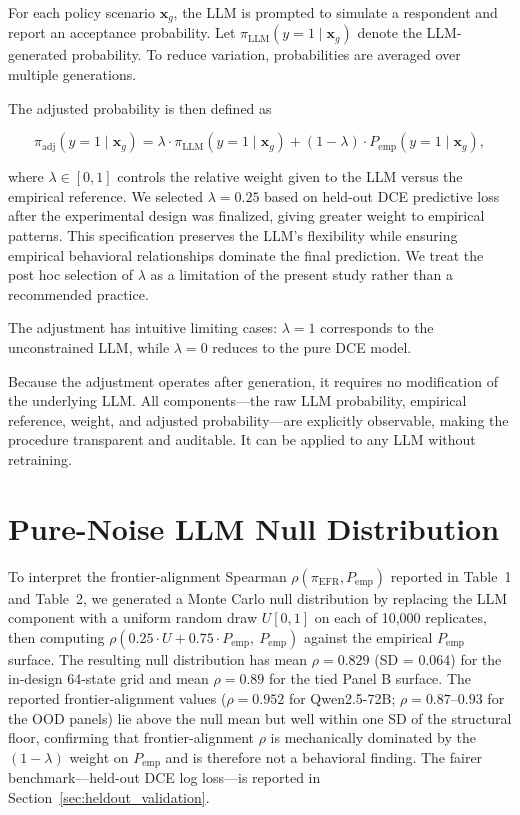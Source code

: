 \documentclass[11pt]{article}
\begin{document}
For each policy scenario $\mathbf{x}_g$, the LLM is prompted to simulate a respondent and report an acceptance probability. Let $\pi_{\mathrm{LLM}}(y=1\mid\mathbf{x}_g)$ denote the LLM-generated probability. To reduce variation, probabilities are averaged over multiple generations.

The adjusted probability is then defined as

\begin{equation}
\pi_{\mathrm{adj}}(y=1\mid\mathbf{x}_g) = \lambda \cdot \pi_{\mathrm{LLM}}(y=1\mid\mathbf{x}_g) + (1-\lambda) \cdot P_{\mathrm{emp}}(y=1\mid\mathbf{x}_g),
\label{eq:adjustment}
\end{equation}

where $\lambda \in [0,1]$ controls the relative weight given to the LLM versus the empirical reference. We selected $\lambda = 0.25$ based on held-out DCE predictive loss after the experimental design was finalized, giving greater weight to empirical patterns. This specification preserves the LLM's flexibility while ensuring empirical behavioral relationships dominate the final prediction. We treat the post hoc selection of $\lambda$ as a limitation of the present study rather than a recommended practice.

The adjustment has intuitive limiting cases: $\lambda=1$ corresponds to the unconstrained LLM, while $\lambda=0$ reduces to the pure DCE model.

Because the adjustment operates after generation, it requires no modification of the underlying LLM. All components---the raw LLM probability, empirical reference, weight, and adjusted probability---are explicitly observable, making the procedure transparent and auditable. It can be applied to any LLM without retraining.

\renewcommand{\thetable}{S\arabic{table}}
\setcounter{table}{0}

\section{Pure-Noise LLM Null Distribution}
\label{sec:null_distribution}

To interpret the frontier-alignment Spearman $\rho(\pi_{\text{EFR}}, P_{\text{emp}})$ reported in Table~1 and Table~2, we generated a Monte Carlo null distribution by replacing the LLM component with a uniform random draw $U[0, 1]$ on each of 10{,}000 replicates, then computing $\rho(0.25 \cdot U + 0.75 \cdot P_{\text{emp}},\ P_{\text{emp}})$ against the empirical $P_{\text{emp}}$ surface. The resulting null distribution has mean $\rho = 0.829$ (SD = 0.064) for the in-design 64-state grid and mean $\rho = 0.89$ for the tied Panel B surface. The reported frontier-alignment values ($\rho = 0.952$ for Qwen2.5-72B; $\rho = 0.87$--$0.93$ for the OOD panels) lie above the null mean but well within one SD of the structural floor, confirming that frontier-alignment $\rho$ is mechanically dominated by the $(1-\lambda)$ weight on $P_{\text{emp}}$ and is therefore not a behavioral finding. The fairer benchmark---held-out DCE log loss---is reported in Section~\ref{sec:heldout_validation}.
\end{document}
